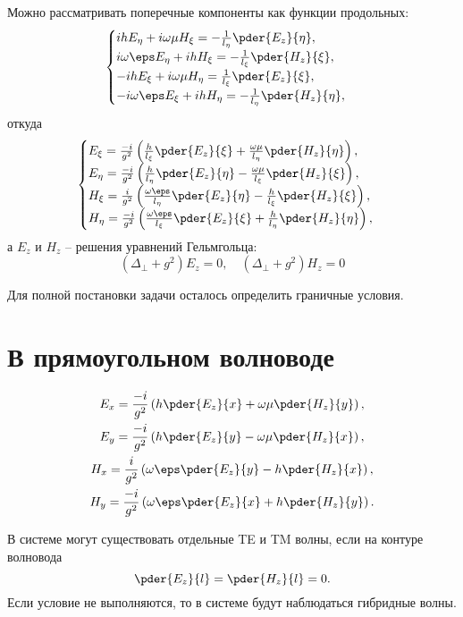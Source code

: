 Можно рассматривать поперечные компоненты как функции продольных:
\[
	\begin{cases}
		ihE_\eta + i\omega\mu H_\xi = -\frac{1}{l_\eta}\pder{E_z}{\eta},\\
		i\omega\eps E_\eta + ihH_\xi = -\frac{1}{l_\xi}\pder{H_z}{\xi},\\
		-ihE_\xi + i\omega\mu H_\eta = \frac{1}{l_\xi}\pder{E_z}{\xi},\\
		- i\omega\eps E_\xi + ihH_\eta = -\frac{1}{l_\eta}\pder{H_z}{\eta},\\
	\end{cases}
\]
откуда
\[
	\begin{cases}
		E_\xi  = \frac{-i}{g^2}\left(\frac{h}{l_\xi}\pder{E_z}{\xi} +\frac{\omega\mu}{l_\eta}\pder{H_z}{\eta}\right),\\
		E_\eta = \frac{-i}{g^2}\left(\frac{h}{l_\eta}\pder{E_z}{\eta} - \frac{\omega\mu}{l_\xi}\pder{H_z}{\xi}\right),\\
		H_\xi  = \frac{i}{g^2}\left(\frac{\omega\eps}{l_\eta}\pder{E_z}{\eta} - \frac{h}{l_\xi}\pder{H_z}{\xi}\right),\\
		H_\eta = \frac{-i}{g^2}\left(\frac{\omega\eps}{l_\xi}\pder{E_z}{\xi} + \frac{h}{l_\eta}\pder{H_z}{\eta}\right),
	\end{cases}
\]
а \( E_z \) и \( H_z \) -- решения уравнений Гельмгольца:
\[
	(\Delta_\perp + g^2) E_z = 0, \quad (\Delta_\perp + g^2) H_z = 0
\]

Для полной постановки задачи осталось определить граничные условия.

\section{В прямоугольном волноводе}

\begin{gather*}
	E_x = \frac{-i}{g^2}\left(h\pder{E_z}{x} + \omega\mu\pder{H_z}{y}\right),\\
	E_y = \frac{-i}{g^2}\left(h\pder{E_z}{y} - \omega\mu\pder{H_z}{x}\right),\\
	H_x = \frac{i}{g^2}\left(\omega\eps\pder{E_z}{y} - h\pder{H_z}{x}\right),\\
	H_y = \frac{-i}{g^2}\left(\omega\eps\pder{E_z}{x} + h\pder{H_z}{y}\right).
\end{gather*}

В системе могут существовать отдельные TE и TM волны, если на контуре волновода
\[
	\pder{E_z}{l} = \pder{H_z}{l} = 0.
\]
Если условие не выполняются, то в системе будут наблюдаться гибридные волны.


